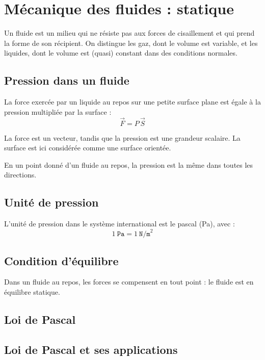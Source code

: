\documentclass[11pt]{article}
\begin{document}
	
	\section*{Mécanique des fluides : statique}
	
	Un fluide est un milieu qui ne résiste pas aux forces de cisaillement et qui prend la forme de son récipient. On distingue les gaz, dont le volume est variable, et les liquides, dont le volume est (quasi) constant dans des conditions normales.
	
	\subsection*{Pression dans un fluide}
	
	La force exercée par un liquide au repos sur une petite surface plane est égale à la pression multipliée par la surface :
	\[
	\vec{F} = P \, \vec{S}
	\]
	
	La force est un vecteur, tandis que la pression est une grandeur scalaire. La surface est ici considérée comme une surface orientée.
	
	En un point donné d’un fluide au repos,   {la pression est la même dans toutes les directions}.
	
	\subsection*{Unité de pression}
	
	L’unité de pression dans le système international est le pascal (Pa), avec :
	\[
	1 \  \texttt{Pa} = 1 \  \texttt{N/m}^2
	\]
	
	\subsection*{Condition d’équilibre}
	
	Dans un fluide au repos, les forces se compensent en tout point : le fluide est en équilibre statique.
	
	\subsection*{Loi de Pascal}
	
	\newpage
	
	\subsection*{Loi de Pascal et ses applications}
	
\end{document}
